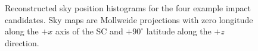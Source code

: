 \documentclass[a4paper]{jpconf}
\begin{document}
\begin{figure}[h!]
	\centering
	\quad
	\\	
        \quad
	\\	
	\caption{Reconstructed sky position histograms for the four example impact candidates. Sky maps are Mollweide projections with zero longitude along the $+x$ axis of the SC and $+90^{\circ}$ latitude along the $+z$ direction.}
\end{figure}
\end{document}
